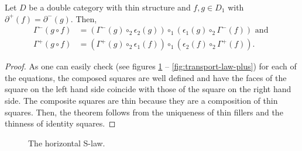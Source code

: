 \begin{lemma} \label{thm:dbl-cat-transport}
Let $D$ be a double category with thin structure and $f, g \in D_1$ with
$\partial^+(f) = \partial^-(g)$. Then,
\begin{align*}
\Gamma^-(g \circ f)
	&= (\Gamma^-(g) \circ_2 \epsilon_2(g)) \circ_1 (\epsilon_1(g) \circ_2 \Gamma^-(f))
	\text{ and } \\
\Gamma^+(g \circ f)
	&= (\Gamma^+(g) \circ_2 \epsilon_1(f)) \circ_1 (\epsilon_2(f) \circ_2 \Gamma^+(f))
	\text{.}
\end{align*}
\end{lemma}
\begin{proof}
As one can easily check (see figures \ref{fig:s-law-horiz} --
\ref{fig:transport-law-plus}) for each of the equations,
the composed squares are well defined and have the faces of the square on the left
hand side coincide with those of the square on the right hand side.
The composite squares are thin because they are a composition of thin squares.
Then, the theorem follows from the uniqueness of thin fillers and the thinness
of identity squares.
\end{proof}

\begin{figure}\centering
{}
\caption{The horizontal S-law.}
\label{fig:s-law-horiz}
\end{figure}

